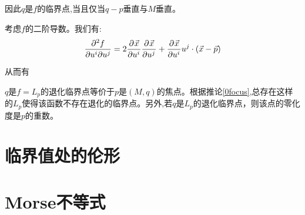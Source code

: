因此$q$是$f$的临界点,当且仅当$q-p$垂直与$M$垂直。

考虑$f$的二阶导数。我们有:
\begin{align*}
	\frac{\partial^2 f}{\partial u^i\partial u^j}=2\frac{\partial^{} \vec{x}}{\partial {u^i}^{}}\frac{\partial^{} \vec{x}}{\partial {u^j}^{}}+\frac{\partial^{} \vec{x}}{\partial {u^i}^{}}u^j\cdot(\vec{x}-\vec{p})
\end{align*}

从而有
\begin{lemma}
	$q$是$f=L_p$的退化临界点等价于$p$是$(M,q)$的焦点。根据推论\ref{0focus},总存在这样的$L_p$使得该函数不存在退化的临界点。另外,若$q$是$L_p$的退化临界点，则该点的零化度是$p$的重数。
\end{lemma}

\section{临界值处的伦形}
\section{Morse不等式}

